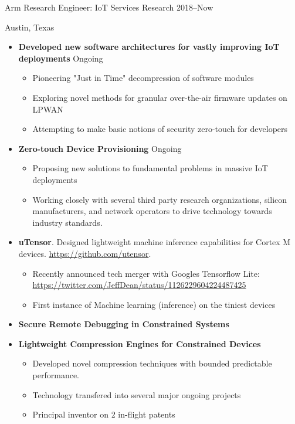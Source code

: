 \documentclass[]{friggeri-cv} %
\begin{document}
\begin{entrylist}


\entry
{Arm}
{Research Engineer: IoT Services Research}
{2018--Now}
{Austin, Texas \\
\begin{itemize}
\item \textbf{Developed new software architectures for vastly improving IoT deployments} Ongoing
\begin{itemize}
    \item Pioneering "Just in Time" decompression of software modules
    \item Exploring novel methods for granular over-the-air firmware updates on LPWAN
    \item Attempting to make basic notions of security zero-touch for developers
\end{itemize}
\item \textbf{Zero-touch Device Provisioning} Ongoing
    \begin{itemize}
        \item Proposing new solutions to fundamental problems in massive IoT deployments
        \item Working closely with several third party research organizations, silicon manufacturers, and network operators to drive technology towards industry standards.
    \end{itemize}
\item \textbf{uTensor}. Designed lightweight machine inference capabilities for Cortex M devices. \url{https://github.com/utensor}.
    \begin{itemize}
    \item Recently announced tech merger with Googles Tensorflow Lite: \url{https://twitter.com/JeffDean/status/1126229604224487425}
    \item First instance of Machine learning (inference) on the tiniest devices
    \end{itemize}
\item \textbf{Secure Remote Debugging in Constrained Systems}
\item \textbf{Lightweight Compression Engines for Constrained Devices}
    \begin{itemize}
        \item Developed novel compression techniques with bounded predictable performance.
        \item Technology transfered into several major ongoing projects
        \item Principal inventor on 2 in-flight patents
    \end{itemize}
\end{itemize} }


\end{entrylist}
\end{document}
